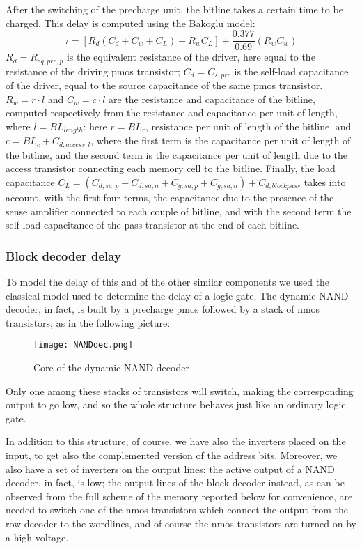 After the switching of the precharge unit, the bitline takes a certain time to be charged. This delay is computed using the Bakoglu model: 
$$\tau=[R_d(C_d+C_w+C_L)+R_wC_L]+\frac{0.377}{0.69}(R_wC_w)$$
$R_d=R_{eq,pre,p}$ is the equivalent resistance of the driver, here equal to the resistance of the driving pmos transistor; $C_d=C_{s,pre}$ is the self-load capacitance of the driver, equal to the source capacitance of the same pmos transistor. $R_w=r\cdot l$ and $C_w=c\cdot l$ are the resistance and capacitance of the bitline, computed respectively from the resistance and capacitance per unit of length, where $l=BL_{length}$: here $r=BL_{r}$, resistance per unit of length of the bitline, and $c=BL_{c}+C_{d,access,l}$, where the first term is the capacitance per unit of length of the bitline, and the second term is the capacitance per unit of length due to the access transistor connecting each memory cell to the bitline. Finally, the load capacitance $C_L=(C_{d,sa,p}+C_{d,sa,n}+C_{g,sa,p}+C_{g,sa,n})+C_{d,blockpass}$ takes into account, with the first four terms, the capacitance due to the presence of the sense amplifier connected to each couple of bitline, and with the second term the self-load capacitance of the pass transistor at the end of each bitline.

\subsubsection{Block decoder delay}
To model the delay of this and of the other similar components we used the classical model used to determine the delay of a logic gate. The dynamic NAND decoder, in fact, is built by a precharge pmos followed by a stack of nmos transistors, as in the following picture:

\begin{center}
	\begin{figure}[H]
		\centering
		\texttt{[image: NANDdec.png]}
		\caption{Core of the dynamic NAND decoder}
	\end{figure}
\end{center}

Only one among these stacks of transistors will switch, making the corresponding output to go low, and so the whole structure behaves just like an ordinary logic gate.

In addition to this structure, of course, we have also the inverters placed on the input, to get also the complemented version of the address bits. Moreover, we also have a set of inverters on the output lines: the active output of a NAND decoder, in fact, is low; the output lines of the block decoder instead, as can be observed from the full scheme of the memory reported below for convenience, are needed to switch one of the nmos transistors which connect the output from the row decoder to the wordlines, and of course the nmos transistors are turned on by a high voltage. 

